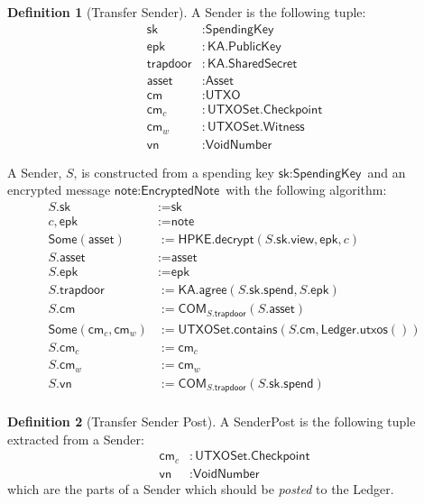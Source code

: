 \documentclass[a4paper]{article}
\theoremstyle{definition}
\newtheorem{definition}{Definition}[subsection]
\newcommand{\Asset}{{\textsf{Asset}}}
\newcommand{\COM}{{\textsf{COM}}}
\newcommand{\Checkpoint}{{\textsf{Checkpoint}}}
\newcommand{\EncryptedNote}{{\textsf{EncryptedNote}}}
\newcommand{\HPKE}{{\textsf{HPKE}}}
\newcommand{\KA}{{\textsf{KA}}}
\newcommand{\Ledger}{{\textsf{Ledger}}}
\newcommand{\PublicKey}{{\textsf{PublicKey}}}
\newcommand{\SenderPost}{{\textsf{SenderPost}}}
\newcommand{\Sender}{{\textsf{Sender}}}
\newcommand{\SharedSecret}{{\textsf{SharedSecret}}}
\newcommand{\Some}{{\textsf{Some}}}
\newcommand{\SpendingKey}{{\textsf{SpendingKey}}}
\newcommand{\Transfer}{{\textsf{Transfer}}}
\newcommand{\UTXOSet}{{\textsf{UTXOSet}}}
\newcommand{\UTXO}{{\textsf{UTXO}}}
\newcommand{\VoidNumber}{{\textsf{VoidNumber}}}
\newcommand{\Witness}{{\textsf{Witness}}}
\newcommand{\agree}{{\textsf{agree}}}
\newcommand{\asset}{{\textsf{asset}}}
\newcommand{\cm}{{\textsf{cm}}}
\newcommand{\contains}{{\textsf{contains}}}
\newcommand{\decrypt}{{\textsf{decrypt}}}
\newcommand{\epk}{{\textsf{epk}}}
\newcommand{\note}{{\textsf{note}}}
\newcommand{\sk}{{\textsf{sk}}}
\newcommand{\spend}{{\textsf{spend}}}
\newcommand{\trapdoor}{{\textsf{trapdoor}}}
\newcommand{\utxos}{{\textsf{utxos}}}
\newcommand{\view}{{\textsf{view}}}
\newcommand{\vn}{{\textsf{vn}}}
\begin{document}
\begin{definition}[\Transfer{} Sender]
    A \Sender{} is the following tuple:
    \begin{align*}
        \sk       &: \SpendingKey \\
        \epk      &: \KA.\PublicKey \\
        \trapdoor &: \KA.\SharedSecret \\
        \asset    &: \Asset \\
        \cm       &: \UTXO \\
        \cm_c     &: \UTXOSet.\Checkpoint \\
        \cm_w     &: \UTXOSet.\Witness \\
        \vn       &: \VoidNumber
    \end{align*}

    A \Sender{}, $S$, is constructed from a spending key $\sk : \SpendingKey$ and an encrypted message $\note : \EncryptedNote$ with the following algorithm:
    \begin{align*}
        S.\sk                &:= \sk \\
        c, \epk              &:= \note \\
        \Some(\asset)        &:= \HPKE.\decrypt(S.\sk.\view, \epk, c) \\
        S.\asset             &:= \asset \\
        S.\epk               &:= \epk \\
        S.\trapdoor          &:= \KA.\agree(S.\sk.\spend, S.\epk) \\
        S.\cm                &:= \COM_{S.\trapdoor}(S.\asset) \\
        \Some(\cm_c, \cm_w)  &:= \UTXOSet.\contains(S.\cm, \Ledger.\utxos()) \\
        S.\cm_c              &:= \cm_c \\
        S.\cm_w              &:= \cm_w \\
        S.\vn                &:= \COM_{S.\trapdoor}(S.\sk.\spend) \\
    \end{align*}
\end{definition}

\begin{definition}[\Transfer{} Sender Post]
    A \SenderPost{} is the following tuple extracted from a \Sender{}:
    \begin{align*}
        \cm_c &: \UTXOSet.\Checkpoint \\
        \vn   &: \VoidNumber
    \end{align*}
    which are the parts of a \Sender{} which should be \emph{posted} to the \Ledger{}.
\end{definition}
\end{document}
